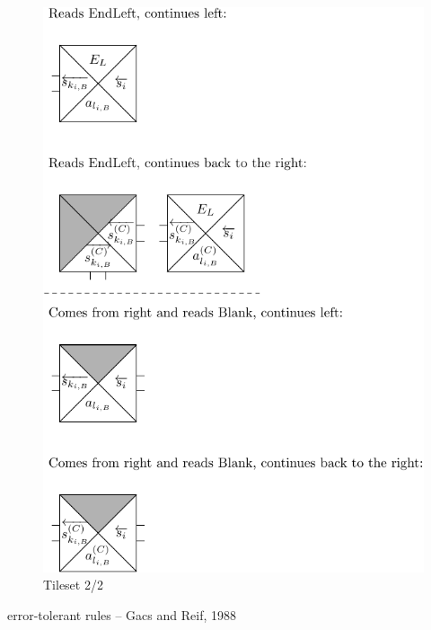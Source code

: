 		\begin{figure}[H]
		\begin{center}
			\includegraphics{./figures/tiles2.pdf}
			\caption{Tileset 2/2}
		\end{center}
		\end{figure}
	
	
	error-tolerant rules -- Gacs and Reif, 1988\\
